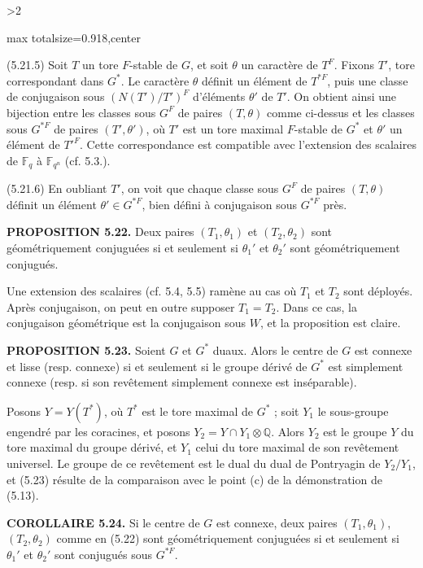 \documentclass[9pt,twoside]{extarticle}
\newcommand{\EditionPage}[3]{%
  \ifnum#1>2\clearpage\fi
  \pdfbookmark[1]{Printed page #2}{fr-folio-#2}%
  \hypertarget{fr-physical-#1}{}%
  \noindent\begin{adjustbox}{max totalsize={\textwidth}{0.918\textheight},center}
  \begin{minipage}[t]{\textwidth}
  \fontsize{9.4}{11.1}\selectfont\justifying
  #3
  \end{minipage}
  \end{adjustbox}%
}
\begin{document}
\EditionPage{33}{134}{%
(5.21.5) Soit \(T\) un tore \(F\)-stable de \(G\), et soit \(\theta\) un caractère de \(T^F\). Fixons \(T'\), tore correspondant dans \(G^*\). Le caractère \(\theta\) définit un élément de \(T^{*F}\), puis une classe de conjugaison sous \((N(T')/T')^F\) d'éléments \(\theta'\) de \(T'\). On obtient ainsi une bijection entre les classes sous \(G^F\) de paires \((T,\theta)\) comme ci-dessus et les classes sous \(G^{*F}\) de paires \((T',\theta')\), où \(T'\) est un tore maximal \(F\)-stable de \(G^*\) et \(\theta'\) un élément de \(T'^F\). Cette correspondance est compatible avec l'extension des scalaires de \(\mathbb F_q\) à \(\mathbb F_{q^n}\) (cf. 5.3.).\par

(5.21.6) En oubliant \(T'\), on voit que chaque classe sous \(G^F\) de paires \((T,\theta)\) définit un élément \(\theta'\in G^{*F}\), bien défini à conjugaison sous \(G^{*F}\) près.\par

\noindent\textbf{PROPOSITION 5.22.} Deux paires \((T_1,\theta_1)\) et \((T_2,\theta_2)\) sont géométriquement conjuguées si et seulement si \(\theta_1'\) et \(\theta_2'\) sont géométriquement conjugués.\par

Une extension des scalaires (cf. 5.4, 5.5) ramène au cas où \(T_1\) et \(T_2\) sont déployés. Après conjugaison, on peut en outre supposer \(T_1=T_2\). Dans ce cas, la conjugaison géométrique est la conjugaison sous \(W\), et la proposition est claire.\par

\noindent\textbf{PROPOSITION 5.23.} Soient \(G\) et \(G^*\) duaux. Alors le centre de \(G\) est connexe et lisse (resp. connexe) si et seulement si le groupe dérivé de \(G^*\) est simplement connexe (resp. si son revêtement simplement connexe est inséparable).\par

Posons \(Y=Y(T^*)\), où \(T^*\) est le tore maximal de \(G^*\) ; soit \(Y_1\) le sous-groupe engendré par les coracines, et posons \(Y_2=Y\cap Y_1\otimes\mathbb Q\). Alors \(Y_2\) est le groupe \(Y\) du tore maximal du groupe dérivé, et \(Y_1\) celui du tore maximal de son revêtement universel. Le groupe de ce revêtement est le dual du dual de Pontryagin de \(Y_2/Y_1\), et (5.23) résulte de la comparaison avec le point (c) de la démonstration de (5.13).\par

\noindent\textbf{COROLLAIRE 5.24.} Si le centre de \(G\) est connexe, deux paires \((T_1,\theta_1)\), \((T_2,\theta_2)\) comme en (5.22) sont géométriquement conjuguées si et seulement si \(\theta_1'\) et \(\theta_2'\) sont conjugués sous \(G^{*F}\).\par

}
\end{document}
